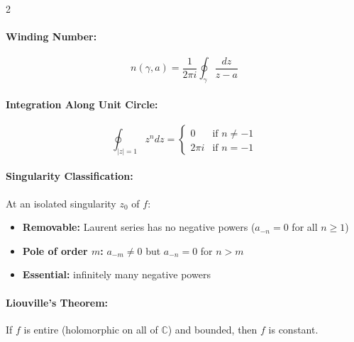 \begin{multicols}{2}
\paragraph{Winding Number:}
\[
n(\gamma, a) = \frac{1}{2\pi i} \oint_{\gamma} \frac{dz}{z-a}
\]

\paragraph{Integration Along Unit Circle:}
\[
\oint_{|z|=1} z^n dz = \begin{cases}
0 & \text{if } n \neq -1 \\
2\pi i & \text{if } n = -1
\end{cases}
\]

\paragraph{Singularity Classification:}
At an isolated singularity $z_0$ of $f$:
\begin{itemize}
    \item \textbf{Removable:} Laurent series has no negative powers ($a_{-n} = 0$ for all $n \geq 1$)
    \item \textbf{Pole of order $m$:} $a_{-m} \neq 0$ but $a_{-n} = 0$ for $n > m$
    \item \textbf{Essential:} infinitely many negative powers
\end{itemize}

\paragraph{Liouville's Theorem:}
If $f$ is entire (holomorphic on all of $\mathbb{C}$) and bounded, then $f$ is constant.

\end{multicols}

\newpage


\practice{}

